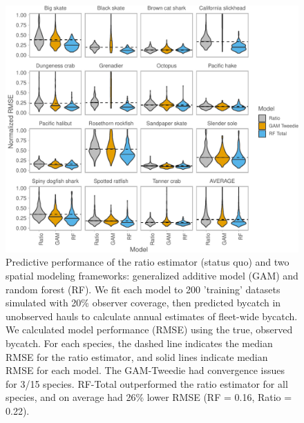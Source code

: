 \documentclass[]{article}
\begin{document}
\begin{figure}

{\centering \includegraphics{bycatch_sim_paper_sepsupp_ices_files/figure-latex/model-comparison-1} 

}

\caption{Predictive performance of the ratio estimator (status quo) and two spatial modeling frameworks: generalized additive model (GAM) and random forest (RF). We fit each model to 200 'training' datasets simulated with 20\% observer coverage, then predicted bycatch in unobserved hauls to calculate annual estimates of fleet-wide bycatch. We calculated model performance (RMSE) using the true, observed bycatch. For each species, the dashed line indicates the median RMSE for the ratio estimator, and solid lines indicate median RMSE for each model. The GAM-Tweedie had convergence issues for 3/15 species. RF-Total outperformed the ratio estimator for all species, and on average had 26\% lower RMSE (RF = 0.16, Ratio = 0.22).}\label{fig:model-comparison}
\end{figure}

\pagebreak
\end{document}

